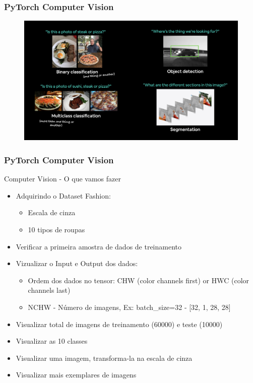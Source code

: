 \documentclass{beamer}
\begin{document}
\begin{frame}
	\frametitle{PyTorch Computer Vision}
	\begin{figure}
		\centering
		\includegraphics[width=1\linewidth]{figures/vision_comp}
	\end{figure}
	
\end{frame}
\begin{frame}
	\frametitle{PyTorch Computer Vision}
	\begin{block}{Computer Vision - O que vamos fazer}
		\begin{itemize}
			\item Adquirindo o Dataset Fashion:
			\begin{itemize}
				\item Escala de cinza
				\item 10 tipos de roupas
			\end{itemize}
			\item Verificar a primeira amostra de dados de treinamento
			\item Vizualizar o Input e Output dos dados:
			\begin{itemize}
				\item Ordem dos dados no tensor: CHW (color channels first) or HWC (color channels last)
				\item NCHW - Número de imagens, Ex: batch\_size=32 - [32, 1, 28, 28]
			\end{itemize}
			\item Visualizar total de imagens de treinamento (60000) e teste (10000)
			\item Visualizar as 10 classes
			\item Visualizar uma imagem, transforma-la na escala de cinza
			\item Visualizar mais exemplares de imagens
		\end{itemize}
	\end{block}
\end{frame}
\end{document}
